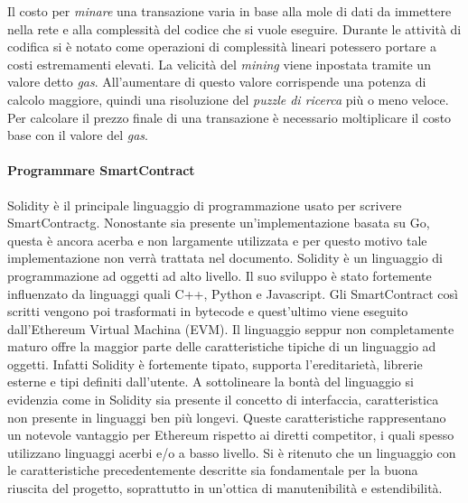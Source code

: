 \medskip
Il costo per \emph{minare} una transazione varia in base alla mole di dati da immettere nella rete e alla complessità del codice che si vuole eseguire. Durante le attività di codifica si è notato come operazioni di complessità lineari potessero portare a costi estremamenti elevati. 
La velicità del \emph{mining} viene inpostata tramite un valore detto \emph{gas}. All'aumentare di questo valore corrispende una potenza di calcolo maggiore, quindi una risoluzione del \emph{puzzle di ricerca} più o meno veloce. 
Per calcolare il prezzo finale di una transazione è necessario moltiplicare il costo base con il valore del \emph{gas}.

\paragraph{Programmare SmartContract}
Solidity è il principale linguaggio di programmazione usato per scrivere \gls{SmartContractg}. Nonostante sia presente un’implementazione basata su Go, questa è ancora acerba e non largamente utilizzata e per questo motivo tale implementazione non verrà trattata nel documento.
Solidity è un linguaggio di programmazione ad oggetti ad alto livello. Il suo sviluppo è stato fortemente influenzato da linguaggi quali C++, Python e Javascript. Gli SmartContract così scritti vengono poi trasformati in bytecode e quest’ultimo viene eseguito dall’Ethereum Virtual Machina (EVM).
Il linguaggio seppur non completamente maturo offre la maggior parte delle caratteristiche tipiche di un linguaggio ad oggetti. Infatti Solidity è fortemente tipato, supporta l’ereditarietà, librerie esterne e tipi definiti dall’utente. A sottolineare la bontà del linguaggio si evidenzia come in Solidity sia presente il concetto di interfaccia, caratteristica non presente in linguaggi ben più longevi. 
Queste caratteristiche rappresentano un notevole vantaggio per Ethereum rispetto ai diretti competitor, i quali spesso utilizzano linguaggi acerbi e/o a basso livello. Si è ritenuto che un linguaggio con le caratteristiche precedentemente descritte sia fondamentale per la buona riuscita del progetto, soprattutto in un’ottica di manutenibilità e estendibilità.

